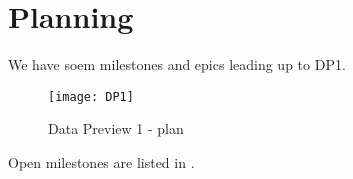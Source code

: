 \section{Planning} \label{sec:plan}

We have soem milestones and epics leading up to DP1.

\begin{figure}
\begin{centering}
\texttt{[image: DP1]}
	\caption{Data Preview 1 - plan \label{fig:plan}}
\end{centering}
\end{figure}



Open milestones are listed in .

